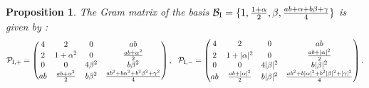 \documentclass[table]{amsart}
\newtheorem{proposition}[theorem]{Proposition}
\numberwithin{equation}{section}
\begin{document}
\begin{proposition}\label{1 propn}
The Gram matrix of the basis $ \mathcal{B}_{\rm{I}} = \{1, \frac{1 +\alpha}{2}, \beta, \frac{ab + \alpha + b \beta +\gamma}{4} \}$ is given by :
$$
\mathcal{P}_{\rm{I}, +}=  
\begin{pmatrix}
4 & 2 & 0 & ab \\
2 & 1 + \alpha^2 & 0 & \frac{ab + \alpha^2}{2} \\
0 & 0 & 4\beta^2 & b\beta^2 \\
ab & \frac{ab + \alpha^2}{2} & b\beta^2 & \frac{a b^2 + b \alpha^2 + b^2 \beta^2 + \gamma^2}{4}
\end{pmatrix},  \ \
\mathcal{P}_{\rm{I}, -} = \begin{pmatrix}
4 & 2 & 0 & ab \\
2 & 1 + |\alpha|^2 & 0 & \frac{ab + |\alpha|^2}{2} \\
0 & 0 & 4|\beta|^2 & b|\beta|^2 \\
ab & \frac{ab + |\alpha|^2}{2} & b|\beta|^2 & \frac{a b^2 + b |\alpha|^2 + b^2 |\beta|^2 + |\gamma|^2}{4} 
\end{pmatrix}.
$$
\end{proposition}
\end{document}
